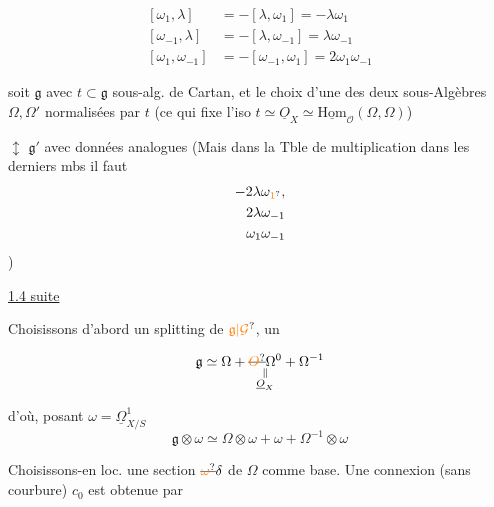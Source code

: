 \[ \begin{aligned}
 [\omega_1,\lambda]&=-[\lambda,\omega_1]=-\lambda\omega_1\\
 {}[\omega_{-1},\lambda]&=-[\lambda,\omega_{-1}]=\lambda\omega_{-1}\\
 {}[\omega_1,\omega_{-1}]&=-[\omega_{-1},\omega_1]=2\omega_1\omega_{-1}
 \end{aligned} \]


soit $\mathfrak g$ avec $t\subset\mathfrak g$ sous-alg. de Cartan, et le choix d'une des deux sous-Algèbres  $\Omega,\Omega'$ normalisées par \uline{$t$} (ce qui fixe l'iso $t\simeq\underline O_X\simeq\underline{\mathrm{Hom}}_{\mathcal O}(\Omega,\Omega)$)

$\updownarrow$ $\mathfrak g'$ avec données analogues (Mais dans la Tble de multiplication dans les derniers mbs il faut
\[ \begin{aligned}-2\lambda\omega_{\unsure{1}},&\\2\lambda\omega_{-1}&\\\omega_1\omega_{-1}&\end{aligned} \]
)



\uline{1.4 suite}

Choisissons d'abord un splitting de  $\unsure{\mathfrak g|\mathcal G}$, un

\[ \mathfrak g\simeq\Omega+\underset{\substack{\Vert\\\underline O_X}}{\deleted{\unsure{O}}\Omega^0}+\Omega^{-1} \]

d'où, posant $\omega=\underline\Omega^1_{X/S}$
\[ \mathfrak g\otimes\omega\simeq\Omega\otimes\omega+\omega+\Omega^{-1}\otimes\omega \]

 Choisissons-en loc. une section $\deleted{\unsure{\omega}}\delta$ de $\Omega$ comme base. Une connexion (sans courbure) $c_0$ est obtenue par

